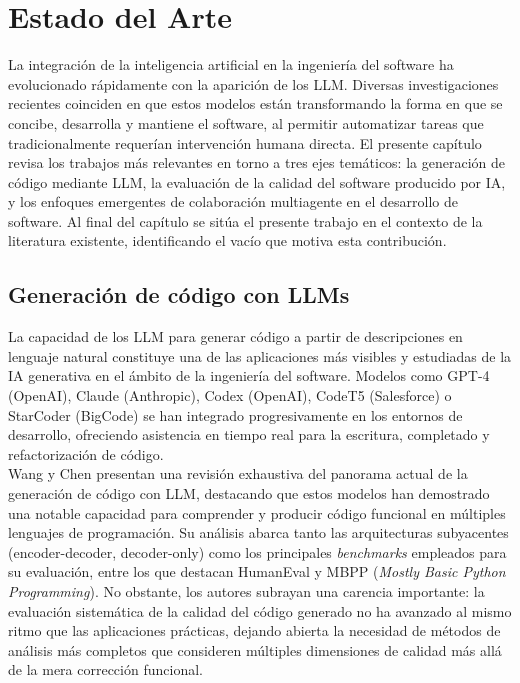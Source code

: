 
\cleardoublepage
\chapter{Estado del Arte} \label{chap:RelatedWork}

La integración de la inteligencia artificial en la ingeniería del software ha evolucionado rápidamente con la aparición de los \ac{LLM}. Diversas investigaciones recientes coinciden en que estos modelos están transformando la forma en que se concibe, desarrolla y mantiene el software, al permitir automatizar tareas que tradicionalmente requerían intervención humana directa. El presente capítulo revisa los trabajos más relevantes en torno a tres ejes temáticos: la generación de código mediante \ac{LLM}, la evaluación de la calidad del software producido por \ac{IA}, y los enfoques emergentes de colaboración multiagente en el desarrollo de software. Al final del capítulo se sitúa el presente trabajo en el contexto de la literatura existente, identificando el vacío que motiva esta contribución.

\section{Generación de código con LLMs} \label{sec:generacion-codigo}

La capacidad de los \ac{LLM} para generar código a partir de descripciones en lenguaje natural constituye una de las aplicaciones más visibles y estudiadas de la \ac{IA} generativa en el ámbito de la ingeniería del software. Modelos como GPT-4 (OpenAI), Claude (Anthropic), Codex (OpenAI), CodeT5 (Salesforce) o StarCoder (BigCode) se han integrado progresivamente en los entornos de desarrollo, ofreciendo asistencia en tiempo real para la escritura, completado y refactorización de código.\\

Wang y Chen \cite{Wang:2023:LLMReview} presentan una revisión exhaustiva del panorama actual de la generación de código con \ac{LLM}, destacando que estos modelos han demostrado una notable capacidad para comprender y producir código funcional en múltiples lenguajes de programación. Su análisis abarca tanto las arquitecturas subyacentes (encoder-decoder, decoder-only) como los principales \textit{benchmarks} empleados para su evaluación, entre los que destacan HumanEval y MBPP (\textit{Mostly Basic Python Programming}). No obstante, los autores subrayan una carencia importante: la evaluación sistemática de la calidad del código generado no ha avanzado al mismo ritmo que las aplicaciones prácticas, dejando abierta la necesidad de métodos de análisis más completos que consideren múltiples dimensiones de calidad más allá de la mera corrección funcional.\\

